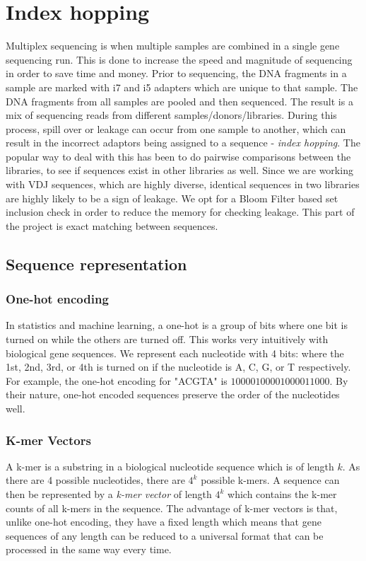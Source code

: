 \documentclass[times, twoside, watermark]{zHenriquesLab-StyleBioRxiv}
\begin{document}
\section*{Index hopping}
Multiplex sequencing is when multiple samples are combined in a single gene sequencing run. This is done to increase the speed and magnitude of sequencing in order to save time and money. Prior to sequencing, the DNA fragments in a sample are marked with i7 and i5 adapters which are unique to that sample. The DNA fragments from all samples are pooled and then sequenced. The result is a mix of sequencing reads from different samples/donors/libraries. During this process, spill over or leakage can occur from one sample to another, which can result in the incorrect adaptors being assigned to a sequence - \textit{index hopping}. The popular way to deal with this has been to do pairwise comparisons between the libraries, to see if sequences exist in other libraries as well. Since we are working with VDJ sequences, which are highly diverse, identical sequences in two libraries are highly likely to be a sign of leakage. We opt for a Bloom Filter based set inclusion check in order to reduce the memory for checking leakage. This part of the project is exact matching between sequences. \cite{indexHopping}

\subsection*{Sequence representation}

\subsubsection{One-hot encoding}
In statistics and machine learning, a one-hot is a group of bits where one bit is turned on while the others are turned off. This works very intuitively with biological gene sequences. We represent each nucleotide with 4 bits: where the 1st, 2nd, 3rd, or 4th is turned on if the nucleotide is A, C, G, or T respectively. For example, the one-hot encoding for "ACGTA" is $10000100001000011000$. By their nature, one-hot encoded sequences preserve the order of the nucleotides well.  
\subsubsection{K-mer Vectors}
A k-mer is a substring in a biological nucleotide sequence which is of length $k$. As there are 4 possible nucleotides, there are $4^{k}$ possible k-mers. A sequence can then be represented by a \textit{k-mer vector} of length $4^{k}$ which contains the k-mer counts of all k-mers in the sequence. The advantage of k-mer vectors is that, unlike one-hot encoding, they have a fixed length which means that gene sequences of any length can be reduced to a universal format that can be processed in the same way every time.
\end{document}
